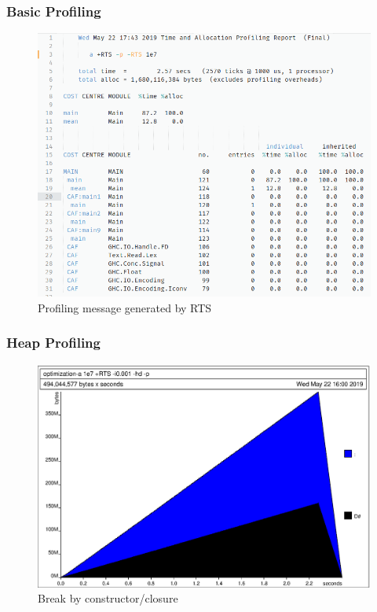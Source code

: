 \documentclass{beamer}
\begin{document}

\begin{frame}
\frametitle{Basic Profiling}
\begin{figure}[hbt!]
\begin{center}
\includegraphics[height=0.7\textheight]{./pic/profiling.png}
\caption{Profiling message generated by RTS}
\end{center}
\end{figure}
\end{frame}


\begin{frame}
\frametitle{Heap Profiling}

\begin{figure}[hbt!]
\begin{center}
\includegraphics[height=0.7\textheight]{./pic/profiling-hd.ps}
\caption{Break by constr­uct­or/­closure}
\end{center}
\end{figure}
\end{frame}
\end{document}

